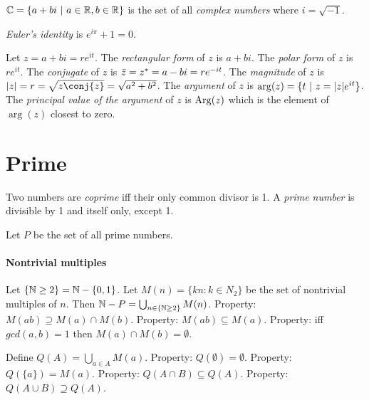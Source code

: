 \(\mathbb{C} = \{ a + bi ~|~ a \in \mathbb{R}, b \in \mathbb{R} \}\)
is the set of all \emph{complex numbers} where \(i = \sqrt{-1}\).

%
\emph{Euler's identity} is \( e^{i \pi} + 1 = 0 \).

Let \(z = a+bi = re^{it}\).
%
%
The \emph{rectangular form} of \(z\) is \(a+bi\).
%
%
The \emph{polar form} of \(z\) is \(re^{it}\).
%
%
%
The \emph{conjugate} of \(z\) is \(\bar{z} = z^* = a-bi = re^{-it}\).
%
%
%
The \emph{magnitude} of \(z\) is \(\abs{z} = r = \sqrt{z\conj{z}} = \sqrt{a^2+b^2}\).
%
%
%
The \emph{argument} of \(z\) is \(\arg(z) = \{ t ~|~ z = |z| e^{it} \}\).
%
%
%
The \emph{principal value of the argument} of \(z\) is \(\mathrm{Arg}(z)\)
which is the element of \(\arg(z)\) closest to zero.

\section{Prime}

%
%
Two numbers are \emph{coprime} iff their only common divisor is 1.
%
%
A \emph{prime number} is divisible by 1 and itself only, except 1.

Let \(P\) be the set of all prime numbers.

\paragraph{Nontrivial multiples}
Let \(\{\mathbb{N}\ge 2\} = \mathbb{N} - \{0,1\}\).
Let \(M(n) = \{ k n : k \in N_2 \}\) be the set of nontrivial multiples of \(n\).
Then \( \mathbb{N} - P = \bigcup_{n \in \{\mathbb{N}\ge 2\}} M(n) \).
Property: \(M(ab) \supseteq M(a) \cap M(b)\).
Property: \(M(ab) \subseteq M(a)\).
Property: iff \(gcd(a,b)=1\) then \(M(a) \cap M(b) = \emptyset\).

Define \(Q(A) = \bigcup_{a \in A} M(a)\).
Property: \(Q(\emptyset) = \emptyset\).
Property: \(Q(\{a\}) = M(a)\).
Property: \(Q(A \cap B) \subseteq Q(A)\).
Property: \(Q(A \cup B) \supseteq Q(A)\).

